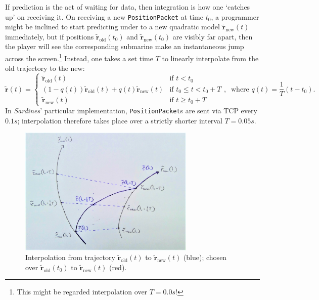 \documentclass[a4paper, 9pt]{article}
\begin{document}
\begin{flushleft}
\vspace{5pt}\noindent
If prediction is the act of waiting for data, then integration is how one `catches up' on receiving it. On receiving a new \texttt{PositionPacket} at time $t_0$, a programmer might be inclined to start predicting under to a new quadratic model $\mathbf{\tilde{r}}_{\textrm{new}}(t)$ immediately, but if positions $\mathbf{\tilde{r}}_{\textrm{old}}(t_0)$ and $\mathbf{\tilde{r}}_{\textrm{new}}(t_0)$ are visibly far apart, then the player will see the corresponding submarine make an instantaneous jump across the screen.\footnote{This might be regarded interpolation over $T = 0.0s$!} Instead, one takes a set time $T$ to linearly interpolate from the old trajectory to the new:
$$\mathbf{\tilde{r}}(t) = \begin{cases} 
\mathbf{\tilde{r}}_{\textrm{old}}(t) & \textrm{if $t < t_0$} \\
(1-q(t))\mathbf{\tilde{r}}_{\textrm{old}}(t) + q(t)\mathbf{\tilde{r}}_{\textrm{new}}(t) & \textrm{if $t_0 \leq t < t_0+T$} \\
\mathbf{\tilde{r}}_{\textrm{new}}(t) & \textrm{if $t \geq t_0+T$}
\end{cases}, \;\; \textrm{where $q(t) = \frac{1}{T}\left(t-t_0\right)$.}$$
In \textit{Sardines}' particular implementation, \texttt{PositionPacket}s are sent via TCP every $0.1s$; interpolation therefore takes place over a strictly shorter interval $T = 0.05s$. 

\begin{figure}[h]
\centering
\includegraphics[width=0.75\textwidth]{Interpolation}
\caption{Interpolation from trajectory $\mathbf{\tilde{r}}_{\textrm{old}}(t)$ to $\mathbf{\tilde{r}}_{\textrm{new}}(t)$ (blue); chosen over $\mathbf{\tilde{r}}_{\textrm{old}}(t_0)$ to $\mathbf{\tilde{r}}_{\textrm{new}}(t)$ (red).}
\label{Interpolation}
\end{figure}


\end{flushleft}
\end{document}

